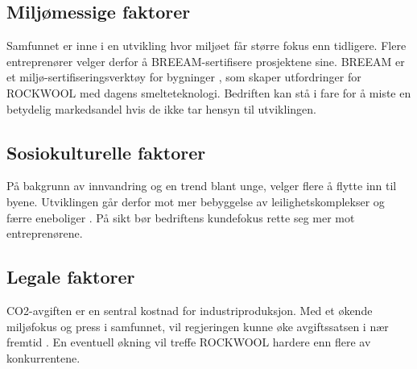 \subsection{Miljømessige faktorer}
Samfunnet er inne i en utvikling hvor miljøet får større fokus enn tidligere. Flere entreprenører velger derfor å BREEAM-sertifisere prosjektene sine. BREEAM er et miljø-\newline sertifiseringsverktøy for bygninger \cite{BREEAM}, som skaper utfordringer for ROCKWOOL med dagens smelteteknologi. Bedriften kan stå i fare for å miste en betydelig markedsandel hvis de ikke tar hensyn til utviklingen.

\subsection{Sosiokulturelle faktorer} 
På bakgrunn av innvandring og en trend blant unge, velger flere å flytte inn til byene. Utviklingen går derfor mot mer bebyggelse av leilighetskomplekser og færre eneboliger \cite{Urbanisering}. På sikt bør bedriftens kundefokus rette seg mer mot entreprenørene.

\subsection{Legale faktorer}
CO2-avgiften \cite{Finansdepartementet2018} er en sentral kostnad for industriproduksjon. Med et økende miljøfokus og press i samfunnet, vil regjeringen kunne øke avgiftssatsen i nær fremtid \cite{DagbladetCO2}. En eventuell økning vil treffe ROCKWOOL hardere enn flere av konkurrentene.






